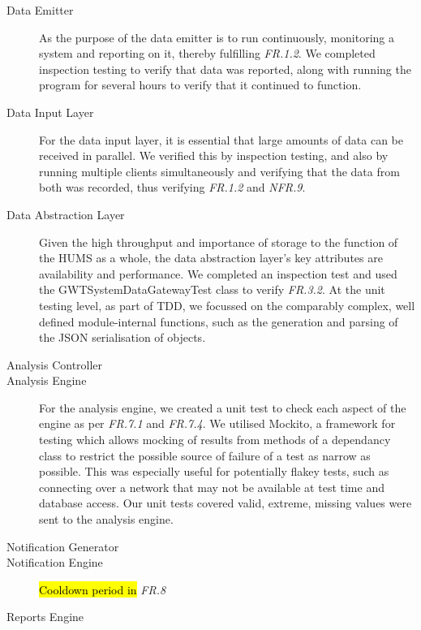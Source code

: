 \documentclass[10pt,a4paper]{article}
\newcommand{\frit}[1]{\textit{FR.#1}}
\newcommand{\nfrit}[1]{\textit{NFR.#1}}
\begin{document}
\begin{description}

  \item[Data Emitter] As the purpose of the data emitter is to run
    continuously, monitoring a system and reporting on it, thereby
    fulfilling \frit{1.2}. We completed inspection testing to verify 
    that data was reported, along with running the program for 
    several hours to verify that it continued to function.

  \item[Data Input Layer] For the data input layer, it is essential that large
    amounts of data can be received in parallel. We verified this by
    inspection testing, and also by running multiple clients simultaneously and
    verifying that the data from both was recorded, thus verifying \frit{1.2}
    and \nfrit{9}.

  \item[Data Abstraction Layer] Given the high throughput and
    importance of storage to the function of the HUMS as a whole, the
    data abstraction layer's key attributes are availability and
    performance. We completed an inspection test and used the 
    GWTSystemDataGatewayTest class to verify \frit{3.2}. At the unit 
    testing level, as  part of TDD, we focussed on the comparably complex,
    well defined module-internal functions, such as the generation and 
    parsing of the JSON serialisation of objects.
    
  \item[Analysis Controller] %
  
  \item[Analysis Engine]
  For the analysis engine, we created a unit test to check each aspect of the 
  engine as per \frit{7.1} and \frit{7.4}. We utilised Mockito, a framework 
  for testing which allows mocking of results from methods of a dependancy 
  class to restrict the possible source of failure of a test as narrow as possible. This was especially useful for potentially flakey tests, such as connecting over a network that may not be available at test time and database access. Our unit tests covered valid, extreme, missing values were sent to the analysis engine.

  \item[Notification Generator] %
  
  \item[Notification Engine] %
  \hl{Cooldown period in} \frit{8}

  \item[Reports Engine] %
  
 \end{description}
\end{document}

